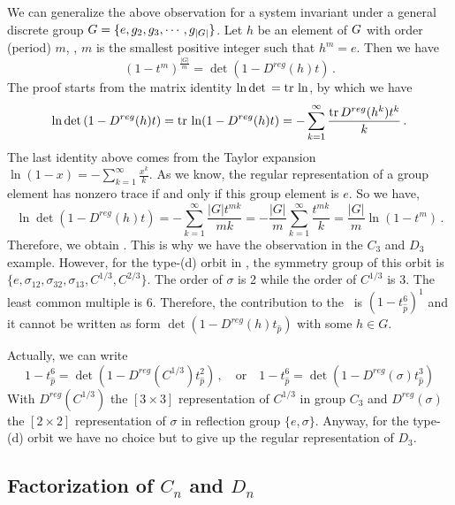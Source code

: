 We can generalize the above observation for a system invariant under
a general discrete group
$G=\{e, g_2, g_3,\cdots, g_{|G|}\}$.
Let $h$ be an element of $G$
with order (period) $m$, \ie, $m$ is the smallest positive integer such
that $h^m = e$. Then we have
\begin{equation}
  \label{eq:symfac}
  (1 - t^m)^{\frac{|G|}{m}} = \det(1 - D^{reg}(h)t)
  \,.
\end{equation}
The proof starts from the matrix identity $\ln\mathrm{det}\, = \mathrm{tr}\,\ln$, by which we have
\[
  \ln \mathrm{det}\,(1 - D^{reg}(h)t) = \mathrm{tr}\, \ln (1 - D^{reg}(h)t)
  = -\sum_{k=1}^\infty \frac{\mathrm{tr}\, D^{reg}(h^k)t^k}{k}
  \,.
\]
The last identity above comes from the Taylor expansion
$\ln(1-x) = -\sum_{k=1}^\infty \frac{x^k}{k}$.
As we know, the regular representation of
a group element has nonzero trace if and only if this group element is
$e$. So we have,
\[
  \ln \det(1 - D^{reg}(h)t) =  -\sum_{k=1}^\infty \frac{|G|t^{mk}}{mk}
  =  -\frac{|G|}{m}\sum_{k=1}^\infty \frac{t^{mk}}{k}
  = \frac{|G|}{m} \ln (1 - t^m)
  \,.
\]
Therefore, we obtain . This is why we have the observation
in the $C_3$ and $D_3$ example. However, for the type-(d) orbit in
, the symmetry group of this orbit is
$\{e, \sigma_{12}, \sigma_{32}, \sigma_{13}, C^{1/3}, C^{2/3}\}$. The order of
$\sigma$ is 2 while the order of $C^{1/3}$ is 3. The least common multiple is
6. Therefore, the contribution to the \dzeta\ is $(1-t_{\hat{p}}^6)^{1}$ and it
cannot be written as form $\det(1 - D^{reg}(h)t_{\hat{p}})$ with some $h\in G$.

Actually, we can write
\[
  1-t_{\hat{p}}^6 = \det(1 - D^{reg}(C^{1/3})t_{\hat{p}}^2) \,,\quad
  \text{or} \quad
  1-t_{\hat{p}}^6 = \det(1 - D^{reg}(\sigma)t_{\hat{p}}^3)
\]
With $D^{reg}(C^{1/3})$ the $[3\times 3]$ representation of $C^{1/3}$ in group $C_3$
and $ D^{reg}(\sigma)$ the $[2\times 2]$ representation of $\sigma$ in
reflection group $\{e, \sigma\}$. Anyway, for the type-(d) orbit we
have no choice but to give up the regular representation of $D_3$.

\subsection{Factorization of $C_n$ and $D_n$}


